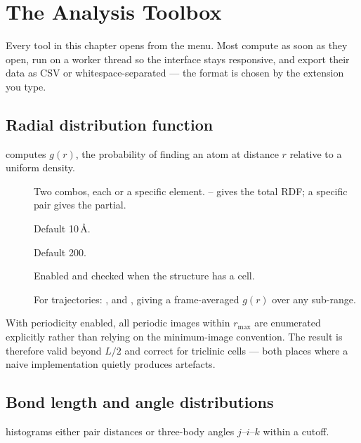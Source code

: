 \chapter{The Analysis Toolbox}
\label{ch:analysis}

Every tool in this chapter opens from the  menu. Most
compute as soon as they open, run on a worker thread so the interface stays
responsive, and export their data as CSV or whitespace-separated
 --- the format is chosen by the extension you type.

\section{Radial distribution function}
\label{sec:rdf}

\menusep{} computes $g(r)$,
the probability of finding an atom at distance $r$ relative to a uniform
density.

\begin{description}
  \item[] Two combos, each  or a specific element.
    -- gives the total RDF; a specific pair gives the
    partial.
  \item[] Default 10\,\AA.
  \item[] Default 200.
  \item[] Enabled and checked when the
    structure has a cell.
  \item[] For trajectories: ,  and
    , giving a frame-averaged $g(r)$ over any sub-range.
\end{description}

\begin{calnote}
With periodicity enabled, all periodic images within $r_\text{max}$ are
enumerated explicitly rather than relying on the minimum-image convention.
The result is therefore valid beyond $L/2$ and correct for triclinic cells
--- both places where a naive implementation quietly produces artefacts.
\end{calnote}

\section{Bond length and angle distributions}

\menusep{} histograms
either pair distances or three-body angles $j$--$i$--$k$ within a cutoff.


